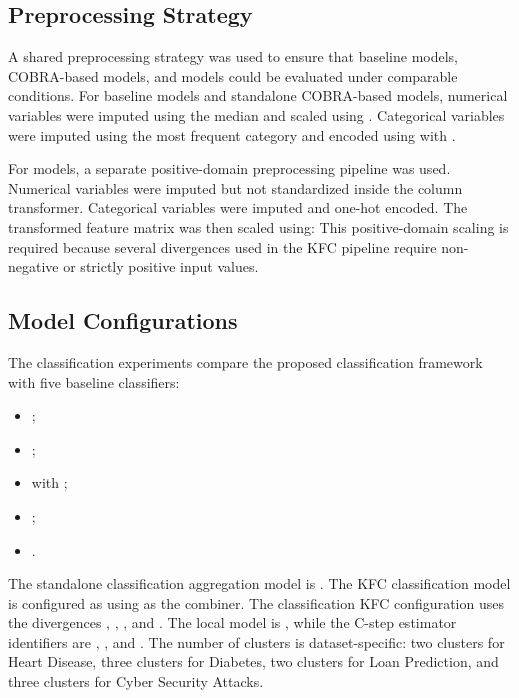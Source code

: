 \subsection{Preprocessing Strategy}

\hs A shared preprocessing strategy was used to ensure that baseline models, COBRA-based models, and \KFCProcedure{} models could be evaluated under comparable conditions. For baseline models and standalone COBRA-based models, numerical variables were imputed using the median and scaled using . Categorical variables were imputed using the most frequent category and encoded using  with .

For \KFCProcedure{} models, a separate positive-domain preprocessing pipeline was used. Numerical variables were imputed but not standardized inside the column transformer. Categorical variables were imputed and one-hot encoded. The transformed feature matrix was then scaled using:
This positive-domain scaling is required because several divergences used in the KFC pipeline require non-negative or strictly positive input values.

\subsection{Model Configurations}

\hs The classification experiments compare the proposed classification framework with five baseline classifiers:

\begin{itemize}
    \item {};
    \item {};
    \item {} with ;
    \item {};
    \item {}.
\end{itemize}

The standalone classification aggregation model is . The KFC classification model is configured as  using  as the combiner. The classification KFC configuration uses the divergences , , , and . The local model is , while the C-step estimator identifiers are , , and . The number of clusters is dataset-specific: two clusters for Heart Disease, three clusters for Diabetes, two clusters for Loan Prediction, and three clusters for Cyber Security Attacks.

